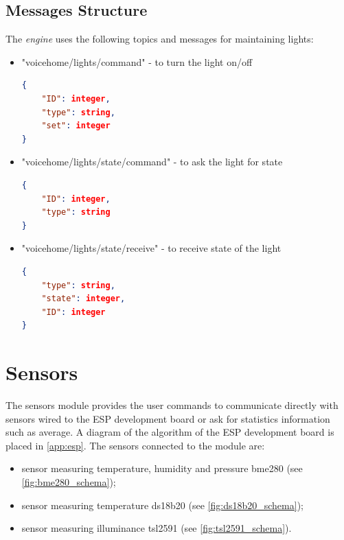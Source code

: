 \subsection{Messages Structure}

The \textit{engine} uses the following topics and messages for maintaining lights:

\begin{itemize}
    \item "voicehome/lights/command" - to turn the light on/off
    \begin{lstlisting}[language=json,firstnumber=1,caption={Structure of JSON message to turn on/off the light in module \textit{Lights}},captionpos=b,xleftmargin=1cm]
{
    "ID": integer,
    "type": string,
    "set": integer
}
    \end{lstlisting}
    \item "voicehome/lights/state/command" - to ask the light for state
    \begin{lstlisting}[language=json,firstnumber=1,caption={Structure of JSON message to asking for the state of the light in module \textit{Lights}},captionpos=b,xleftmargin=1cm]
{
    "ID": integer,
    "type": string
}
    \end{lstlisting}
    \item "voicehome/lights/state/receive" - to receive state of the light
    \begin{lstlisting}[language=json,firstnumber=1,caption={Structure of JSON message to receive state of the light in module \textit{Lights}},captionpos=b,xleftmargin=1cm]
{
    "type": string,
    "state": integer,
    "ID": integer
}
    \end{lstlisting}
\end{itemize}

\section{Sensors}

The sensors module provides the user commands to communicate directly with sensors wired to the ESP development board or ask for statistics information such as average. A diagram of the algorithm of the ESP development board is placed in \cref{app:esp}. The sensors connected to the module are:
\begin{itemize}
    \item sensor measuring temperature, humidity and pressure bme280 (see \cref{fig:bme280_schema});
    \item sensor measuring temperature ds18b20 (see \cref{fig:ds18b20_schema});
    \item sensor measuring illuminance tsl2591 (see \cref{fig:tsl2591_schema}).
\end{itemize}

